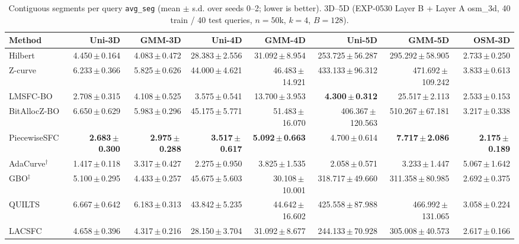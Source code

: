 \begin{table}[t]
\centering\small
\caption{Contiguous segments per query \texttt{avg\_seg} (mean $\pm$ s.d. over seeds 0--2; lower is better). 3D--5D (EXP-0530 Layer B + Layer A osm\_3d, 40 train / 40 test queries, $n=50$k, $k=4$, $B=128$).}
\label{tab:exp1110_0530_avg_seg}
\begin{tabular}{lrrrrrrr}
\toprule
Method & Uni-3D & GMM-3D & Uni-4D & GMM-4D & Uni-5D & GMM-5D & OSM-3D \\
\midrule
Hilbert & 4.450\,$\pm$\,0.164 & 4.083\,$\pm$\,0.472 & 28.383\,$\pm$\,2.556 & 31.092\,$\pm$\,8.954 & 253.725\,$\pm$\,56.287 & 295.292\,$\pm$\,58.905 & 2.733\,$\pm$\,0.250 \\
Z-curve & 6.233\,$\pm$\,0.366 & 5.825\,$\pm$\,0.626 & 44.000\,$\pm$\,4.621 & 46.483\,$\pm$\,14.921 & 433.133\,$\pm$\,96.312 & 471.692\,$\pm$\,109.242 & 3.833\,$\pm$\,0.613 \\
LMSFC-BO & 2.708\,$\pm$\,0.315 & 4.108\,$\pm$\,0.525 & 3.575\,$\pm$\,0.541 & 13.700\,$\pm$\,3.953 & \textbf{4.300\,$\pm$\,0.312} & 25.517\,$\pm$\,2.113 & 2.533\,$\pm$\,0.153 \\
BitAllocZ-BO & 6.650\,$\pm$\,0.629 & 5.983\,$\pm$\,0.296 & 45.175\,$\pm$\,5.771 & 51.483\,$\pm$\,16.070 & 406.367\,$\pm$\,120.563 & 510.267\,$\pm$\,67.181 & 3.217\,$\pm$\,0.338 \\
PiecewiseSFC & \textbf{2.683\,$\pm$\,0.300} & \textbf{2.975\,$\pm$\,0.288} & \textbf{3.517\,$\pm$\,0.617} & \textbf{5.092\,$\pm$\,0.663} & 4.700\,$\pm$\,0.614 & \textbf{7.717\,$\pm$\,2.086} & \textbf{2.175\,$\pm$\,0.189} \\
AdaCurve$^\dagger$ & 1.417\,$\pm$\,0.118 & 3.317\,$\pm$\,0.427 & 2.275\,$\pm$\,0.950 & 3.825\,$\pm$\,1.535 & 2.058\,$\pm$\,0.571 & 3.233\,$\pm$\,1.447 & 5.067\,$\pm$\,1.642 \\
GBO$^\ddagger$ & 5.100\,$\pm$\,0.295 & 4.433\,$\pm$\,0.257 & 45.675\,$\pm$\,5.603 & 30.108\,$\pm$\,10.001 & 318.717\,$\pm$\,49.660 & 311.358\,$\pm$\,80.985 & 2.692\,$\pm$\,0.375 \\
QUILTS & 6.667\,$\pm$\,0.642 & 6.183\,$\pm$\,0.313 & 43.842\,$\pm$\,5.235 & 44.642\,$\pm$\,16.602 & 425.558\,$\pm$\,87.988 & 466.992\,$\pm$\,131.065 & 3.058\,$\pm$\,0.224 \\
LACSFC & 4.658\,$\pm$\,0.396 & 4.317\,$\pm$\,0.216 & 28.150\,$\pm$\,3.704 & 31.092\,$\pm$\,8.677 & 244.133\,$\pm$\,70.928 & 305.008\,$\pm$\,40.573 & 2.617\,$\pm$\,0.166 \\
\bottomrule
\end{tabular}
\end{table}

